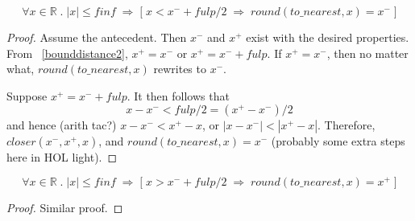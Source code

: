 \begin{lem}
\label{rnddown}
\begin{equation*}
\forall x \in \mathbb{R} \; . \; |x| \leq finf \;
\Longrightarrow \;
\big [ \; x < x^- + fulp/2 \; \Longrightarrow \; round(to\_nearest, x) = x^-
\; \big ]
\end{equation*}
\begin{proof} Assume the antecedent. Then $x^-$ and $x^+$ exist with the
desired properties. From ~\ref{bounddistance2}, $x^+ = x^-$ or $x^+ =
x^- + fulp$. If $x^+ = x^-$, then no matter what, $round(to\_nearest,x)$
rewrites to $x^-$.

Suppose $x^+ = x^- + fulp$. It then follows that
\begin{equation*}
x - x^- < fulp/2 = (x^+ - x^-)/2
\end{equation*}
and hence (arith tac?) $x - x^- < x^+ - x$, or $|x - x^-| < |x^+ - x|$. 
Therefore, $closer(x^-, x^+, x)$, and $round(to\_nearest, x) = x^-$ 
(probably some extra steps here in HOL light).
\end{proof}
\end{lem}

\begin{lem}
\label{rndup}
\begin{equation*}
\forall x \in \mathbb{R} \; . \; |x| \leq finf \;
\Longrightarrow \;
\big [ \; x > x^- + fulp/2 \; \Longrightarrow \; round(to\_nearest, x) = x^+
\; \big ]
\end{equation*}
\begin{proof} Similar proof.
\end{proof}
\end{lem}

